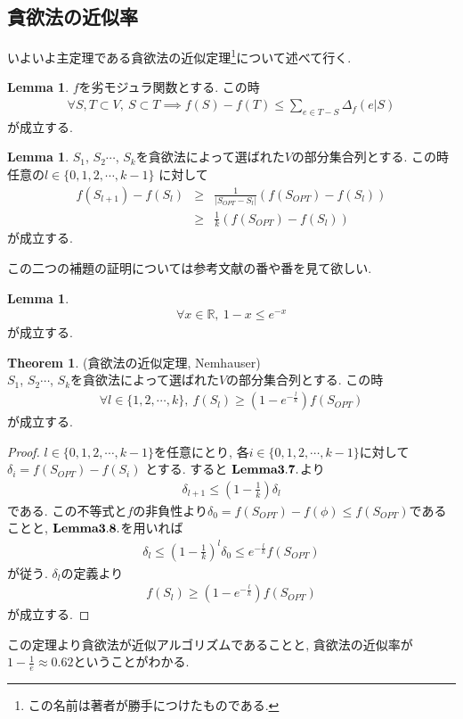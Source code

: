 \documentclass[11pt, a4paper, dvipdfmx]{jsbook}
\theoremstyle{definition}
\newtheorem{Theorem+}[Axiom+]{Theorem}
\newtheorem{Lemma+}[Axiom+]{Lemma}
\newcommand{\R}{\mathbb{R}}
\begin{document}
\subsection{貪欲法の近似率}
いよいよ主定理である貪欲法の近似定理\footnote{この名前は著者が勝手につけたものである.}について述べて行く.
\begin{Lemma+}
    $f$を劣モジュラ関数とする. この時
    \begin{align*}
        \forall S, T\subset V,~ S\subset T\implies f(S) - f(T)\leq \sum_{e\in T - S}\Delta_{f}(e|S)
    \end{align*}
    が成立する.
\end{Lemma+}
\begin{Lemma+}
    $S_{1}$, $S_{2}$$\cdots$, $S_{k}$を貪欲法によって選ばれた$V$の部分集合列とする. この時任意の$l\in\{0, 1, 2, \cdots, k - 1\}$
    に対して 
    \begin{eqnarray*}
          f(S_{l + 1}) -f(S_{l})&\geq& \frac{1}{|S_{OPT} - S_{l}|}(f(S_{OPT}) - f(S_{l})) \\
                                                               &\geq& \frac{1}{k}(f(S_{OPT}) - f(S_{l}))
    \end{eqnarray*}
    が成立する.
\end{Lemma+}
この二つの補題の証明については参考文献の\cite{sub1}番や\cite{sub2}番を見て欲しい.
\begin{Lemma+}
    \begin{align*}
        \forall x\in\R, ~1 - x\leq e^{-x}
    \end{align*}
    が成立する.
\end{Lemma+}
\begin{Theorem+}(貪欲法の近似定理, Nemhauser)\\
  $S_{1}$, $S_{2}$$\cdots$, $S_{k}$を貪欲法によって選ばれた$V$の部分集合列とする. この時
  \begin{align*}
      \forall l\in\{1, 2, \cdots, k\}, ~f(S_{l}) \geq\left (1 - e^{-\frac{l}{k}}\right)f(S_{OPT})
  \end{align*}
  が成立する. 
  \begin{proof}
       $l\in\{0, 1, 2, \cdots, k - 1\}$を任意にとり, 各$i\in\{0, 1, 2, \cdots, k - 1\}$に対して$\delta_{i} = f(S_{OPT}) - f(S_{i})$ とする. すると
       ${\bf Lemma 3.7.}$より
      \begin{align*}
          \delta_{l+1}\leq\left(1 - \frac{1}{k}\right)\delta_{l}
      \end{align*}
      である. この不等式と$f$の非負性より$\delta_{0} = f(S_{OPT}) - f(\phi)\leq f(S_{OPT})$であることと, ${\bf Lemma 3.8.}$を用いれば
      \begin{align*}
          \delta_{l}\leq \left(1 - \frac{1}{k}\right)^{l}\delta_{0}\leq e^{-\frac{l}{k}}f(S_{OPT})
      \end{align*}
      が従う. $\delta_{l}$の定義より
      \begin{align*}
          f(S_{l}) \geq\left (1 - e^{-\frac{l}{k}}\right)f(S_{OPT})
      \end{align*}
      が成立する.
  \end{proof}
\end{Theorem+}
この定理より貪欲法が近似アルゴリズムであることと, 貪欲法の近似率が $1 - \frac{1}{e} \approx 0.62$ということがわかる.
\end{document}
